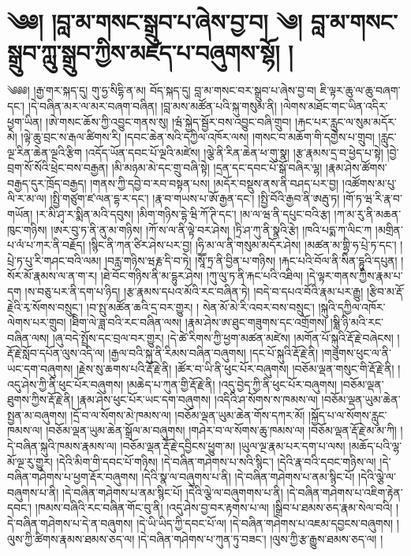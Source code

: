 \chapter{༄༅། །བླ་མ་གསང་སྒྲུབ་པ་ཞེས་བྱ་བ། ༄། བླ་མ་གསང་སྒྲུབ་ཀླུ་སྒྲུབ་ཀྱིས་མཛད་པ་བཞུགས་སྷོ། ། }༄༅༅། །རྒྱ་གར་སྐད་དུ། གུ་ཧྱ་སིདྷི་ན་མ། བོད་སྐད་དུ། བླ་མ་གསང་བར་སྒྲུབ་པ་ཞེས་བྱ་བ། ཇི་ལྟར་ཆུ་ལ་ཆུ་བཞག་དང་། །དེ་བཞིན་མར་ལ་མར་བཞག་བཞིན། །བླ་མས་མཚོན་པའི་སྐུ་གསུམ་ནི། །ལེགས་མཐོང་གང་ཡིན་འདིར་ཕྱག་ཡིན། །ཨེ་གསང་ཆོས་ཀྱི་འབྱུང་གནས་སུ། །ཝཾ་སྐྱེད་སྦྱོར་བས་འབྱུང་བཞི་གྲུབ། །རྐང་པར་རླུང་ལ་སུམ་མདོར་མེ། །ལྟེ་ཆུ་བྲང་ས་རྒལ་ཚིགས་རི། །དབང་ཆེན་སའི་དཀྱིལ་འཁོར་ལས། །གསང་བ་མཆོག་གི་དགྱེས་པ་གྲུབ། །རླུང་ལྔ་རིན་ཆེན་ལྔའི་རྩིག །འདོད་ཡོན་དབང་པོ་ལྔའི་མཛེས། །ལྕེ་ནི་རིན་ཆེན་ཕ་གུ་སྣ། །རྩ་རྣམས་དྲ་བ་ཕྱེད་པ་སྟེ། །བྱེ་བྲག་སོ་སོའི་ཕྲེང་བས་བརྒྱན། །མི་མཉམ་མེ་དང་གྲུ་བཞི་སྟེ། །དྲན་དང་དབང་པོ་སྒོ་བཞིར་ལྷ། །རྣམ་ཤེས་ཚོགས་བརྒྱད་དུར་ཁྲོད་བརྒྱད། །གནས་ཀྱི་དབྱེ་བ་རབ་བསྟན་པས། །མདོར་བསྡུས་ནས་ནི་བཤད་པར་བྱ། །འཚོགས་མ་པུ་ལི་ར་མ་ལ། །སྤྱི་གཙུག་ཛ་ལན་དྷ་ར་དང་། །རྣ་བ་གཡས་པ་ཨོ་རྒྱན་དང་། །སྤྱི་བོའི་རྒྱབ་ནི་ཨརྦུ་ཏ། །གོ་ཏ་ཝ་རི་རྣ་བ་གཡོན། །ར་མི་ཤྭ་ར་སྨིན་མའི་དབུས། །མིག་གཉིས་དྷེ་ཝི་ཀོ་ཊི་དང་། །མ་ལ་ཝ་ནི་དཔུང་བའི་རྩ། །ཀ་མ་རུ་ནི་མཆན་ཁུང་གཉིས། །ཨར་བུ་ཏ་ནི་ནུ་མ་གཉིས། །ཀོ་ས་ལ་ནི་ལྟེ་བར་ཤེས། །ཏྲི་ཤ་ཀུ་ནི་སྣའི་རྩེ། །ཁའི་པདྨ་ཀ་ལིང་ཀ །མགྲིན་པ་ལཾ་པ་ཀར་ནི་བརྗོད། །སྙིང་ནི་ཀན་ཙིར་ཤེས་པར་བྱ། །ཧི་མ་ལ་ནི་གསུམ་མདོར་ཤེས། །མཚན་མ་གྷྲི་ཧ་པྲེ་ཏ་དང་། །པྲེ་ཏ་པུ་རི་གཤང་བའི་ལམ། །བརླ་གཉིས་ཝརྞ་དི་བ་ཏེ། །སཱཽ་ཏྲ་ནི་བྱིན་པ་གཉིས། །རྐང་པའི་བོལ་ནི་སིན་དྷུའི་དཔུན། །སོར་མོ་རྣམས་ལ་ན་ག་ར། །ཐེ་བོང་གཉིས་ནི་མ་དྷུར་ཤེས། །ཀུ་ལུ་ཏ་ནི་རྐང་པའི་འཐིལ། །དེ་ལྟར་གནས་ཀྱིས་རྣམ་པ་དག །ས་བཅུ་པར་ནི་དག་པ་ཉིད། །རྩ་རྣམས་དཔའ་མོའི་རང་བཞིན་ཏེ། །བདེ་བ་དཔའ་བོའི་རྣམ་པར་རྒྱུ། །རྩིབ་མ་རྡོ་རྗེའི་རྭ་སོགས་བསྲུང་། །བ་སྤུ་མཚོན་ཆའི་དྲ་བར་གྱུར། །
སེན་མོ་མེ་རི་འབར་བས་བསྲུང་། །སྐུའི་དཀྱིལ་འཁོར་ལེགས་པར་གྲུབ། །ཐིིག་ལེ་ཟླ་བའི་རང་བཞིན་ལས། །རྣམ་ཤེས་ཨ་ཐུང་གཟུགས་དང་འགྲོགས། །སྷླི་ཉི་མའི་རང་བཞིན་ལས། །ཞུ་བདེ་སྤྲོས་དང་བྲལ་བར་གྱུར། །དེ་ཚེ་རིགས་ཀྱི་ཕྱག་མཚན་མཛེས། །མགོན་པོ་སྐུའི་རྡོ་རྗེ་བཞེངས། །རྡོ་རྗེ་སློབ་དཔོན་ལུས་འདི་ལ། །རྒྱལ་བའི་སྐུ་ནི་རིམས་བཞིན་བཞུགས། །དང་པོ་སྐུའི་རྡོ་རྗེ་ནི། །གཟུགས་ཕུང་ལ་ནི་ཡང་དག་བཞུགས། །རྗེས་སུ་ཆགས་པའི་རྡོ་རྗེ་ནི། །ཚོར་བ་ཡི་ནི་ཕུང་པོར་བཞུགས། །བཅོམ་ལྡན་གསུང་གི་རྡོ་རྗེ་ནི། །འདུ་ཤེས་ཀྱི་ནི་ཕུང་པོར་བཞུགས། །མཆེད་པ་ཀུན་གྱི་རྡོ་རྗེ་ནི། །འདུ་བྱེད་ཀྱི་ནི་ཕུང་པོར་བཞུགས། །བཅོམ་ལྡན་ཐུགས་ཀྱིས་རྡོ་རྗེ་ནི། །རྣམ་ཤེས་ཕུང་པོར་ཡང་དག་བཞུགས། །འདིའི་ཤ་སོགས་ས་ཁམས་ལ། །བཅོམ་ལྡན་ཡུམ་ཆེན་སྤྱན་མ་བཞུགས། །དྲོ་བ་ལ་སོགས་མེ་ཁམས་ལ། །བཅོམ་ལྡན་ཡུམ་ཆེན་གོས་དཀར་མོ། །སྐྱོད་པ་ལ་སོགས་རླུང་ཁམས་ལ། །བཅོམ་ལྡན་ཡུམ་ཆེན་སྒྲོལ་མ་བཞུགས། །གཤེར་བ་ལ་སོགས་ཆུ་ཁམས་ལ། །བཅོམ་ལྡན་རྡོ་རྗེ་མ་མ་ཀི། །དེ་བཞིན་སྐུའི་ཁམས་རྣམས་ལ། །བཅོམ་ལྡན་རྡོ་རྗེ་དབྱིངས་ཕྱུག་མ། །ཡུལ་ལྔ་རྣམ་པར་དག་པ་ལས། །མཆོད་པའི་ལྷ་མོ་ལྔ་རུ་གྱུར། །དེའི་མིག་གི་དབང་པོ་གཉིས། །དེ་བཞིན་གཤེགས་པ་སའི་སྙིང་། །དེའི་རྣ་བའི་དབང་གཉིས་ལ། །དེ་བཞིན་གཤེགས་པ་ཕྱག་རྡོར་བཞུགས། །དེའི་སྣ་ལ་བཞུགས་པ་ནི། །དེ་བཞིན་གཤེགས་པ་ནམ་སྙིང་པོ། །དེའི་ལྕེ་ལ་བཞུགས་པ་ནི། །དེ་བཞིན་གཤེགས་པ་ནམ་སྙིང་པོ། །དེའི་ལྕེ་ལ་བཞུགགས་པ་ནི། །དེ་བཞིན་གཤེགས་པ་འཇིག་རྟེན་དབང་། །ཁམས་བཞིའི་རང་བཞིན་གོང་བུ་ནི། །འདུ་ཤེས་བྱ་བར་རྟགས་པ་ལ། །སྒྲིབ་པ་ཐམས་ཅད་རྣམ་སེལ་བའི། །དེ་བཞིན་གཤེགས་པ་དེ་ན་བཞུགས། །དེ་ཡི་ཡིད་ཀྱི་དབང་པོ་ལ། །དེ་བཞིན་གཤེགས་པ་འཇམ་དབྱངས་བཞུགས། །ལུས་ཀྱི་ཚིགས་རྣམས་ཐམས་ཅད་ལ། །དེ་བཞིན་གཤེགས་པ་ཀུན་ཏུ་བཟང་། །ལུས་ཀྱི་རྩ་རྒྱུས་ཐམས་ཅད་ལ། །
